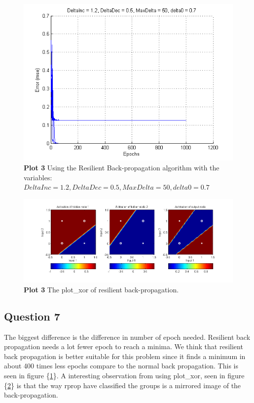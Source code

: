 \documentclass[a4paper]{article}
\begin{document}
\begin{figure}[h!] %
    \caption{\label{fig:plot3_rprop}\textbf{Plot 3} Using the Resilient Back-propagation algorithm with the variables: $DeltaInc = 1.2, DeltaDec = 0.5, MaxDelta = 50, delta0 = 0.7$}
    \includegraphics[]{plot3_rprop.png}
\end{figure}
\begin{figure}[h!] %
    \caption{\label{fig:good_rprop_xor_plot}\textbf{Plot 3} The plot\_xor of resilient back-propagation.}
    \includegraphics[scale=0.55]{good_rprop_xor_plot.png}
\end{figure}
\subsection*{Question 7}
The biggest difference is the difference in number of epoch needed. Resilient back propagation needs a lot fewer epoch to reach a minima.
We think that resilient back propagation is better suitable for this problem since it finds a minimum in about 400 times less epochs compare to the normal back propagation. This is seen in figure \{\ref{fig:plot3_rprop}\}.
A interesting observation from using plot\_xor, seen in figure \{\ref{fig:good_rprop_xor_plot}\} is that the way rprop have classified the groups is a mirrored image of the back-propagation. 
\end{document}
